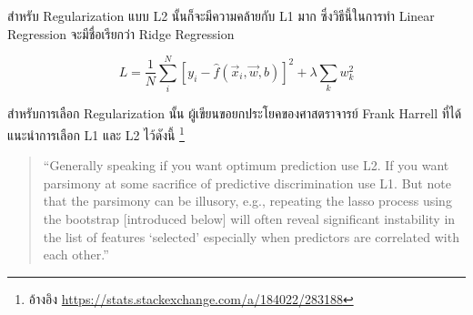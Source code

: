 สำหรับ Regularization แบบ L2 นั้นก็จะมีความคล้ายกับ L1 มาก ซึ่งวิธีนี้ในการทำ Linear Regression จะมีชื่อเรียกว่า Ridge Regression

\begin{equation}
    L = \frac{1}{N}\sum_i^N \left[y_i - \hat{f}(\vec{x}_i, \vec{w}, b)\right]^2 + \lambda \sum_k w_k^2
\end{equation}

สำหรับการเลือก Regularization นั้น ผู้เขียนขอยกประโยคของศาสตราจารย์ Frank Harrell ที่ได้แนะนำการเลือก L1 และ L2 ไว้ดังนี้%
\footnote{อ้างอิง \url{https://stats.stackexchange.com/a/184022/283188}}

\blockquote{\enquote{Generally speaking if you want optimum prediction use L2. 
If you want parsimony at some sacrifice of predictive discrimination use L1. 
But note that the parsimony can be illusory, e.g., repeating the lasso process 
using the bootstrap [introduced below] will often reveal significant instability 
in the list of features \enquote{selected} especially when predictors are correlated with each other.}}
